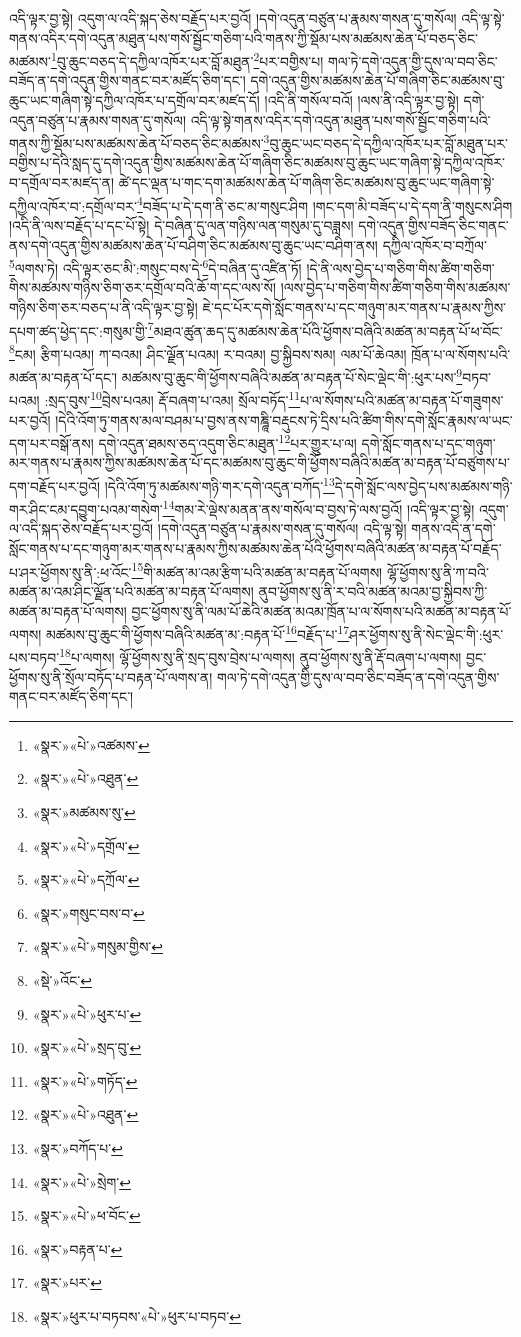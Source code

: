 འདི་ལྟར་བྱ་སྟེ། འདུག་ལ་འདི་སྐད་ཅེས་བརྗོད་པར་བྱའོ། །དགེ་འདུན་བཙུན་པ་རྣམས་གསན་དུ་གསོལ། འདི་ལྟ་སྟེ་གནས་འདིར་དགེ་འདུན་མཐུན་པས་གསོ་སྦྱོང་གཅིག་པའི་གནས་ཀྱི་སྡོམ་པས་མཚམས་ཆེན་པོ་བཅད་ཅིང་མཚམས་\footnote{«སྣར་»«པེ་»འཚམས་}བུ་ཆུང་བཅད་དེ་དཀྱིལ་འཁོར་པར་བློ་མཐུན་\footnote{«སྣར་»«པེ་»འཐུན་}པར་བགྱིས་པ། གལ་ཏེ་དགེ་འདུན་གྱི་དུས་ལ་བབ་ཅིང་བཟོད་ན་དགེ་འདུན་གྱིས་གནང་བར་མཛོད་ཅིག་དང་། དགེ་འདུན་གྱིས་མཚམས་ཆེན་པོ་གཞིག་ཅིང་མཚམས་བུ་ཆུང་ཡང་གཞིག་སྟེ་དཀྱིལ་འཁོར་པ་དགྲོལ་བར་མཛད་དོ། །འདི་ནི་གསོལ་བའོ། །ལས་ནི་འདི་ལྟར་བྱ་སྟེ། དགེ་འདུན་བཙུན་པ་རྣམས་གསན་དུ་གསོལ། འདི་ལྟ་སྟེ་གནས་འདིར་དགེ་འདུན་མཐུན་པས་གསོ་སྦྱོང་གཅིག་པའི་གནས་ཀྱི་སྡོམ་པས་མཚམས་ཆེན་པོ་བཅད་ཅིང་མཚམས་\footnote{«སྣར་»མཚམས་སུ་}བུ་ཆུང་ཡང་བཅད་དེ་དཀྱིལ་འཁོར་པར་བློ་མཐུན་པར་བགྱིས་པ་དེའི་སླད་དུ་དགེ་འདུན་གྱིས་མཚམས་ཆེན་པོ་གཞིག་ཅིང་མཚམས་བུ་ཆུང་ཡང་གཞིག་སྟེ་དཀྱིལ་འཁོར་བ་དགྲོལ་བར་མཛད་ན། ཚེ་དང་ལྡན་པ་གང་དག་མཚམས་ཆེན་པོ་གཞིག་ཅིང་མཚམས་བུ་ཆུང་ཡང་གཞིག་སྟེ་དཀྱིལ་འཁོར་བ་:དགྲོལ་བར་\footnote{«སྣར་»«པེ་»དགྲོལ་}བཟོད་པ་དེ་དག་ནི་ཅང་མ་གསུང་ཤིག །གང་དག་མི་བཟོད་པ་དེ་དག་ནི་གསུངས་ཤིག །འདི་ནི་ལས་བརྗོད་པ་དང་པོ་སྟེ། དེ་བཞིན་དུ་ལན་གཉིས་ལན་གསུམ་དུ་བཟླས། དགེ་འདུན་གྱིས་བཟོད་ཅིང་གནང་ནས་དགེ་འདུན་གྱིས་མཚམས་ཆེན་པོ་བཤིག་ཅིང་མཚམས་བུ་ཆུང་ཡང་བཤིག་ནས། དཀྱིལ་འཁོར་བ་བཀྲོལ་\footnote{«སྣར་»«པེ་»དཀྲོལ་}ལགས་ཏེ། འདི་ལྟར་ཅང་མི་:གསུང་བས་དེ་\footnote{«སྣར་»གསུང་བས་བ་}དེ་བཞིན་དུ་འཛིན་ཏོ། །དེ་ནི་ལས་བྱེད་པ་གཅིག་གིས་ཚིག་གཅིག་གིས་མཚམས་གཉིས་ཅིག་ཅར་དགྲོལ་བའི་ཆོ་ག་དང་ལས་སོ། །ལས་བྱེད་པ་གཅིག་གིས་ཚིག་གཅིག་གིས་མཚམས་གཉིས་ཅིག་ཅར་བཅད་པ་ནི་འདི་ལྟར་བྱ་སྟེ། ཇེ་དང་པོར་དགེ་སློང་གནས་པ་དང་གཉུག་མར་གནས་པ་རྣམས་ཀྱིས་དཔག་ཚད་ཕྱེད་དང་:གསུམ་གྱི་\footnote{«སྣར་»«པེ་»གསུམ་གྱིས་}མཐའ་ཚུན་ཆད་དུ་མཚམས་ཆེན་པོའི་ཕྱོགས་བཞིའི་མཚན་མ་བརྟན་པོ་ཕ་བོང་\footnote{«སྡེ་»འོང་}ངམ། རྩིག་པའམ། ཀ་བའམ། ཤིང་ལྗོན་པའམ། ར་བའམ། བྱ་སྐྱིབས་སམ། ལམ་པོ་ཆེའམ། ཁྲོན་པ་ལ་སོགས་པའི་མཚན་མ་བརྟན་པོ་དང་། མཚམས་བུ་ཆུང་གི་ཕྱོགས་བཞིའི་མཚན་མ་བརྟན་པོ་སེང་ལྡེང་གི་:ཕུར་པས་\footnote{«སྣར་»«པེ་»ཕུར་པ་}བཏབ་པའམ། :སྲད་བུས་\footnote{«སྣར་»«པེ་»སྲད་བུ་}བྲེས་པའམ། རྡོ་བཞག་པ་འམ། སྲོལ་བཏོད་\footnote{«སྣར་»«པེ་»གཏོད་}པ་ལ་སོགས་པའི་མཚན་མ་བརྟན་པོ་གཟུགས་པར་བྱའོ། །དེའི་འོག་ཏུ་གནས་མལ་བཤམ་པ་བྱས་ནས་གཎྜཱི་བརྡུངས་ཏེ་དྲིས་པའི་ཚིག་གིས་དགེ་སློང་རྣམས་ལ་ཡང་དག་པར་བསྒོ་ནས། དགེ་འདུན་ཐམས་ཅད་འདུག་ཅིང་མཐུན་\footnote{«སྣར་»«པེ་»འཐུན་}པར་གྱུར་པ་ལ། དགེ་སློང་གནས་པ་དང་གཉུག་མར་གནས་པ་རྣམས་ཀྱིས་མཚམས་ཆེན་པོ་དང་མཚམས་བུ་ཆུང་གི་ཕྱོགས་བཞིའི་མཚན་མ་བརྟན་པོ་བཙུགས་པ་དག་བརྗོད་པར་བྱའོ། །དེའི་འོག་ཏུ་མཚམས་གཉི་གར་དགེ་འདུན་བཀོད་\footnote{«སྣར་»བཀོད་པ་}དེ་དགེ་སློང་ལས་བྱེད་པས་མཚམས་གཉི་གར་ཤིང་ངམ་དབྱུག་པའམ་གསེག་\footnote{«སྣར་»«པེ་»སྲེག་}གམ་རེ་ལྡེས་མནན་ནས་གསོལ་བ་བྱས་ཏེ་ལས་བྱའོ། །འདི་ལྟར་བྱ་སྟེ། འདུག་ལ་འདི་སྐད་ཅེས་བརྗོད་པར་བྱའོ། །དགེ་འདུན་བཙུན་པ་རྣམས་གསན་དུ་གསོལ། འདི་ལྟ་སྟེ། གནས་འདི་ན་དགེ་སློང་གནས་པ་དང་གཉུག་མར་གནས་པ་རྣམས་ཀྱིས་མཚམས་ཆེན་པོའི་ཕྱོགས་བཞིའི་མཚན་མ་བརྟན་པོ་བརྗོད་པ་ཤར་ཕྱོགས་སུ་ནི་:ཕ་འོང་\footnote{«སྣར་»«པེ་»ཕ་བོང་}གི་མཚན་མ་འམ་རྩིག་པའི་མཚན་མ་བརྟན་པོ་ལགས། ལྷོ་ཕྱོགས་སུ་ནི་ཀ་བའི་མཚན་མ་འམ་ཤིང་ལྗོན་པའི་མཚན་མ་བརྟན་པོ་ལགས། ནུབ་ཕྱོགས་སུ་ནི་ར་བའི་མཚན་མའམ་བྱ་སྐྱིབས་ཀྱི་མཚན་མ་བརྟན་པོ་ལགས། བྱང་ཕྱོགས་སུ་ནི་ལམ་པོ་ཆེའི་མཚན་མའམ་ཁྲོན་པ་ལ་སོགས་པའི་མཚན་མ་བརྟན་པོ་ལགས། མཚམས་བུ་ཆུང་གི་ཕྱོགས་བཞིའི་མཚན་མ་:བརྟན་པོ་\footnote{«སྣར་»བརྟན་པ་}བརྗོད་པ་\footnote{«སྣར་»པར་}ཤར་ཕྱོགས་སུ་ནི་སེང་ལྡེང་གི་:ཕུར་པས་བཏབ་\footnote{«སྣར་»ཕུར་པ་བཏབས་«པེ་»ཕུར་པ་བཏབ་}པ་ལགས། ལྷོ་ཕྱོགས་སུ་ནི་སྲད་བུས་བྲེས་པ་ལགས། ནུབ་ཕྱོགས་སུ་ནི་རྡོ་བཞག་པ་ལགས། བྱང་ཕྱོགས་སུ་ནི་སྲོལ་བཏོད་པ་བརྟན་པོ་ལགས་ན། གལ་ཏེ་དགེ་འདུན་གྱི་དུས་ལ་བབ་ཅིང་བཟོད་ན་དགེ་འདུན་གྱིས་གནང་བར་མཛོད་ཅིག་དང་། 